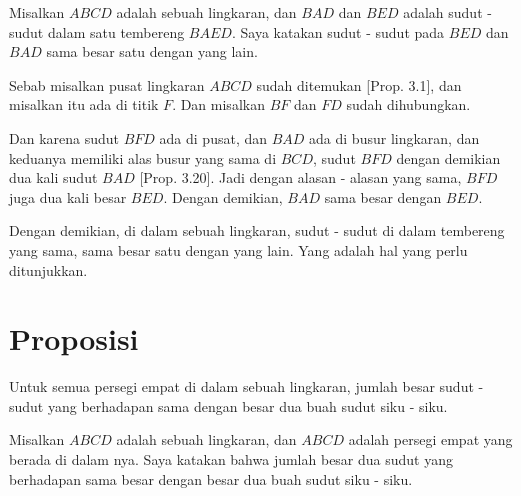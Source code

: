 \documentclass[a4paper]{book}
\begin{document}
Misalkan $ABCD$ adalah sebuah lingkaran, dan $BAD$ dan $BED$ adalah sudut - 
sudut dalam satu tembereng $BAED$. Saya katakan sudut - sudut pada $BED$ dan 
$BAD$ sama besar satu dengan yang lain.

Sebab misalkan pusat lingkaran $ABCD$ sudah ditemukan [Prop. 3.1], dan misalkan
itu ada di titik $F$. Dan misalkan $BF$ dan $FD$ sudah dihubungkan.

Dan karena sudut $BFD$ ada di pusat, dan $BAD$ ada di busur lingkaran, dan 
keduanya memiliki alas busur yang sama di $BCD$, sudut $BFD$ dengan demikian
dua kali sudut $BAD$ [Prop. 3.20]. Jadi dengan alasan - alasan yang sama, $BFD$
juga dua kali besar $BED$. Dengan demikian, $BAD$ sama besar dengan $BED$.

Dengan demikian, di dalam sebuah lingkaran, sudut - sudut di dalam tembereng 
yang sama, sama besar satu dengan yang lain. Yang adalah hal yang perlu ditunjukkan.


\section*{\centering Proposisi \thesection}
Untuk semua persegi empat di dalam sebuah lingkaran, jumlah besar sudut - sudut
yang berhadapan sama dengan besar dua buah sudut siku - siku.

\begin{center}
\end{center}

Misalkan $ABCD$ adalah sebuah lingkaran, dan $ABCD$ adalah persegi empat yang
berada di dalam nya. Saya katakan bahwa jumlah besar dua sudut yang 
berhadapan sama besar dengan besar dua buah sudut siku - siku.
\end{document}
